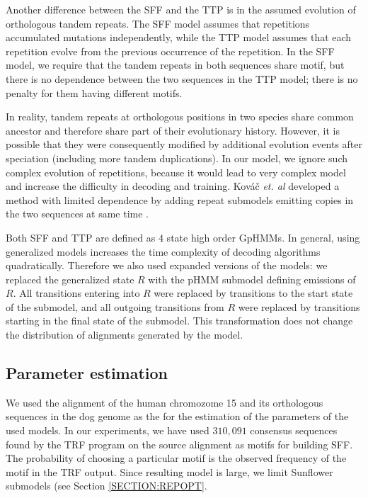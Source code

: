 Another difference between the SFF and the TTP is in the assumed evolution of
orthologous tandem repeats.  The SFF model assumes that repetitions accumulated
mutations independently, while the TTP model assumes that each repetition
evolve from the previous occurrence of the repetition. In the SFF model, we
require that the tandem repeats in both sequences share motif, but there is no
dependence between the two sequences in the TTP model; there is no penalty for
them having different motifs.

In reality, tandem repeats at orthologous positions in two species share common
ancestor and therefore share part of their evolutionary history. However, it is
possible that they were consequently modified by additional evolution events
after speciation (including more tandem duplications). In our model, we ignore
such complex evolution of repetitions, because it would lead to very complex
model and increase the difficulty in decoding and training. Kováč {\it et. al}
developed a method with limited dependence by adding repeat submodels emitting
copies in the two sequences at same time \cite{Kovac2012}.

Both SFF and TTP are defined as $4$ state high order GpHMMs.  In general, using
generalized models increases the time complexity of decoding algorithms
quadratically. Therefore we also used expanded versions of the models: we
replaced the generalized state $R$ with the pHMM submodel defining emissions of
$R$. All transitions entering into $R$ were replaced by transitions to the
start state of the submodel, and all outgoing transitions from $R$ were
replaced by transitions starting in the final state of the submodel. This
transformation does not change the distribution of alignments generated by the
model.  

\subsection{Parameter estimation}\label{SECTION:ALNPAREST}
We used the alignment of the human chromozome 15 and its orthologous sequences
in the dog genome as the  for the estimation of
the parameters of the used models.
In our experiments, we have used $310,091$ consensus sequences found by the TRF
program on the source alignment as motifs for building SFF.  The probability of choosing a particular
motif is the observed frequency of the motif in the TRF output. Since resulting
model is large, we limit Sunflower submodels (see Section \ref{SECTION:REPOPT}.

